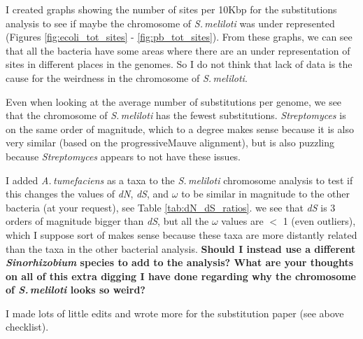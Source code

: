 \documentclass[12pt]{article}
\newcommand{\s}{\textit{Sinorhizobium}\xspace}
\newcommand{\smel}{\textit{S.\,meliloti}\xspace}
\newcommand{\agro}{\textit{A.\,tumefaciens}\xspace}
\newcommand{\p}{progressiveMauve\xspace}
\newcommand{\strep}{\textit{Streptomyces}\xspace}
\newcommand{\dn}{\textit{dN}\xspace}
\newcommand{\ds}{\textit{dS}\xspace}
\begin{document}
I created graphs showing the number of sites per 10Kbp for the substitutions analysis to see if maybe the chromosome of \smel was under represented (Figures \ref{fig:ecoli_tot_sites} - \ref{fig:pb_tot_sites}).
From these graphs, we can see that all the bacteria have some areas where there are an under representation of sites in different places in the genomes.
So I do not think that lack of data is the cause for the weirdness in the chromosome of \smel.

Even when looking at the average number of substitutions per genome, we see that the chromosome of \smel has the fewest substitutions.
\strep is on the same order of magnitude, which to a degree makes sense because it is also very similar (based on the \p alignment), but is also puzzling because \strep appears to not have these issues.

I added \agro as a taxa to the \smel chromosome analysis to test if this changes the values of \dn, \ds, and $\omega$ to be similar in magnitude to the other bacteria (at your request), see Table \ref{tab:dN_dS_ratios}.
we see that \ds is 3 orders of magnitude bigger than \ds, but all the $\omega$ values are $<$ 1 (even outliers), which I suppose sort of makes sense because these taxa are more distantly related than the taxa in the other bacterial analysis.
\textbf{Should I instead use a different \s species to add to the analysis? What are your thoughts on all of this extra digging I have done regarding why the chromosome of \smel looks so weird?}

I made lots of little edits and wrote more for the substitution paper (see above checklist).
\end{document}
